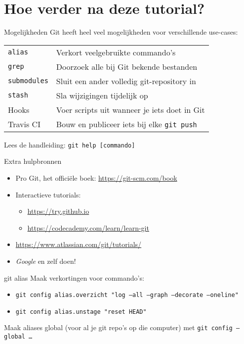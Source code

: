\section[Hoe verder?]{Hoe verder na deze tutorial?}

\begin{frame}{Mogelijkheden}
	Git heeft heel veel mogelijkheden voor verschillende use-cases:
	\begin{center}
		\begin{tabular}{ll}
			\texttt{alias} & Verkort veelgebruikte commando's \\
			\texttt{grep}	& Doorzoek alle bij Git bekende bestanden \\
			\texttt{submodules} & Sluit een ander volledig git-repository in \\
			\texttt{stash} & Sla wijzigingen tijdelijk op\\
			Hooks & Voer scripts uit wanneer je iets doet in Git \\
			Travis CI & Bouw en publiceer iets bij elke \texttt{git push}
		\end{tabular}
	\end{center}
	Lees de handleiding: \texttt{git help [commando]}
\end{frame}

\begin{frame}{Extra hulpbronnen}
	\begin{itemize}
		\item Pro Git, het offici\"ele boek: \url{https://git-scm.com/book}
		\item Interactieve tutorials:
			\begin{itemize}
				\item \url{https://try.github.io}
				\item \url{https://codecademy.com/learn/learn-git}
			\end{itemize}
		\item \url{https://www.atlassian.com/git/tutorials/}
		\item \emph{Google} en zelf doen!
	\end{itemize}
\end{frame}

\begin{frame}{git alias}
	Maak verkortingen voor commando's:
	\begin{itemize}
		\item \texttt{git config alias.overzicht "log --all --graph --decorate --oneline"}
		\item \texttt{git config alias.unstage "reset HEAD"}
	\end{itemize}
	Maak aliases global (voor al je git repo's op die computer) met \texttt{git config --global \ldots}
\end{frame}

